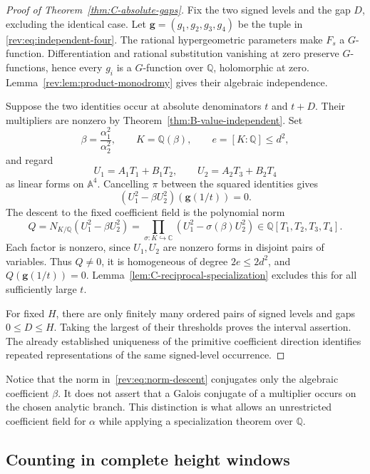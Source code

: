 \begin{proof}[Proof of Theorem~\ref{thm:C-absolute-gaps}]
Fix the two signed levels and the gap $D$, excluding the identical
case.  Let $\mathbf g=(g_1,g_2,g_3,g_4)$ be the tuple in
\eqref{rev:eq:independent-four}.  The rational hypergeometric
parameters make $F_s$ a $G$-function.  Differentiation and rational
substitution vanishing at zero preserve $G$-functions, hence every
$g_i$ is a $G$-function over $\mathbb Q$, holomorphic at zero.
Lemma~\ref{rev:lem:product-monodromy} gives their algebraic
independence.

Suppose the two identities occur at absolute denominators $t$ and
$t+D$.  Their multipliers are nonzero by
Theorem~\ref{thm:B-value-independent}.  Set
\[
 \beta=\frac{\alpha_1^2}{\alpha_2^2},\qquad
 K=\mathbb Q(\beta),\qquad e=[K:\mathbb Q]\leq d^2,
\]
and regard
\[
 U_1=A_1T_1+B_1T_2,\qquad U_2=A_2T_3+B_2T_4
\]
as linear forms on $\mathbb A^4$.  Cancelling $\pi$ between the
squared identities gives
\[
             (U_1^2-\beta U_2^2)(\mathbf g(1/t))=0.
\]
The descent to the fixed coefficient field is the polynomial norm
\begin{equation}\label{rev:eq:norm-descent}
 Q=N_{K/\mathbb Q}(U_1^2-\beta U_2^2)
   =\prod_{\sigma:K\hookrightarrow\mathbb C}
               (U_1^2-\sigma(\beta)U_2^2)
       \in\mathbb Q[T_1,T_2,T_3,T_4].
\end{equation}
Each factor is nonzero, since $U_1,U_2$ are nonzero forms in disjoint
pairs of variables.  Thus $Q\ne0$, it is homogeneous of degree
$2e\leq2d^2$, and $Q(\mathbf g(1/t))=0$.
Lemma~\ref{lem:C-reciprocal-specialization} excludes this for all
sufficiently large $t$.

For fixed $H$, there are only finitely many ordered pairs of signed
levels and gaps $0\leq D\leq H$.  Taking the largest of their
thresholds proves the interval assertion.  The already established
uniqueness of the primitive coefficient direction identifies repeated
representations of the same signed-level occurrence.
\end{proof}

Notice that the norm in~\eqref{rev:eq:norm-descent} conjugates only
the algebraic coefficient $\beta$.  It does not assert that a Galois
conjugate of a multiplier occurs on the chosen analytic branch.  This
distinction is what allows an unrestricted coefficient field for
$\alpha$ while applying a specialization theorem over $\mathbb Q$.

\subsection{Counting in complete height windows}
\label{sec:C-semirational-counting}

